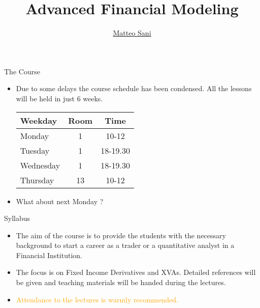\documentclass{beamer}
\title{Advanced Financial Modeling}
\author{\href{mailto:matteo.sani@unisi.it}{Matteo Sani}}
\begin{document}
\begin{frame}[plain]
	\maketitle
\end{frame}

\begin{frame}{The Course}
	\begin{itemize}
		\item Due to some delays the course schedule has been condensed. All the lessons will be held in just 6 weeks.
		
		\begin{table}[bt]
			\begin{tabular}{|l|c|c|} \hline
				\textbf{Weekday} & \textbf{Room} & \textbf{Time} \\ \hline
				Monday & 1\footnotemark & 10-12 \\ \hline
				Tuesday & 1 & 18-19.30 \\ \hline		
				Wednesday & 1 & 18-19.30 \\ \hline
				Thursday & 13 & 10-12\\ \hline
			\end{tabular}
		\end{table}
		\item What about next Monday ?
	\end{itemize}
\end{frame}

\begin{frame}{Syllabus}
	\begin{itemize}
	\item The aim of the course is to provide the students with the necessary background to start a career as a trader or a quantitative analyst in a Financial Institution.
	\item The focus is on Fixed Income Derivatives and XVAs. Detailed references will be given and teaching materials will be handed during the lectures.
	\item \textcolor{orange}{Attendance to the lectures is warmly recommended.}
\end{itemize}
\end{frame}
\end{document}
